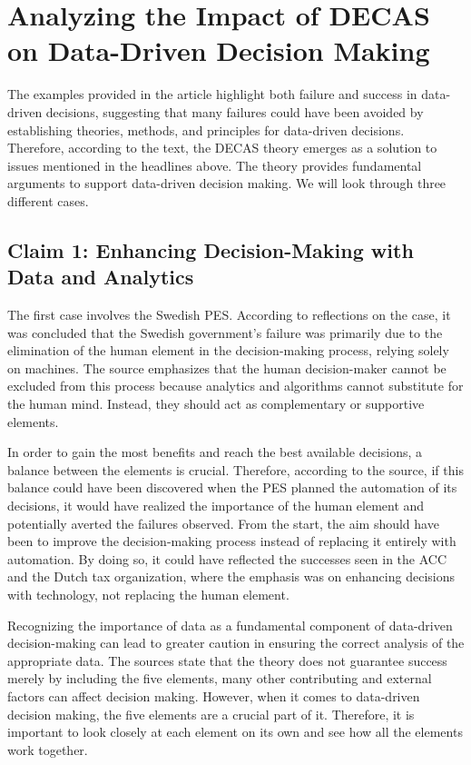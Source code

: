 \section{Analyzing the Impact of DECAS on Data-Driven Decision Making} 
The examples provided in the article highlight both failure and success in data-driven decisions, suggesting that many failures could have been avoided by establishing theories, methods, and principles for data-driven decisions. Therefore, according to the text, the DECAS theory emerges as a solution to issues mentioned in the headlines above. The theory provides fundamental arguments to support data-driven decision making. We will look through three different cases.

\subsection{Claim 1: Enhancing Decision-Making with Data and Analytics}
The first case involves the Swedish PES. According to reflections on the case, it was concluded that the Swedish government's failure was primarily due to the elimination of the human element in the decision-making process, relying solely on machines. The source emphasizes that the human decision-maker cannot be excluded from this process because analytics and algorithms cannot substitute for the human mind. Instead, they should act as complementary or supportive elements.

In order to gain the most benefits and reach the best available decisions, a balance between the elements is crucial. Therefore, according to the source, if this balance could have been discovered when the PES planned the automation of its decisions, it would have realized the importance of the human element and potentially averted the failures observed. From the start, the aim should have been to improve the decision-making process instead of replacing it entirely with automation. By doing so, it could have reflected the successes seen in the ACC and the Dutch tax organization, where the emphasis was on enhancing decisions with technology, not replacing the human element.

Recognizing the importance of data as a fundamental component of data-driven decision-making can lead to greater caution in ensuring the correct analysis of the appropriate data.
The sources state that the theory does not guarantee success merely by including the five elements, many other contributing and external factors can affect decision making. However, when it comes to data-driven decision making, the five elements are a crucial part of it. Therefore, it is important to look closely at each element on its own and see how all the elements work together. 

